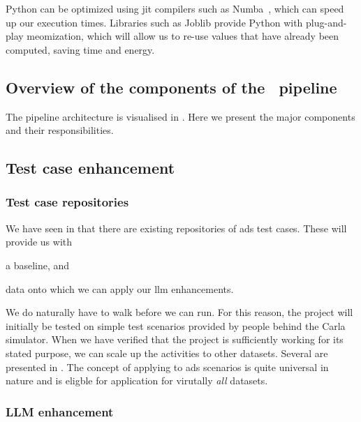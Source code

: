 Python can be optimized using \acrfull{jit} compilers such as Numba~\cite{numba}, which can speed up
our execution times. Libraries such as Joblib provide Python with plug-and-play
meomization, which will allow us to re-use values that have already been
computed, saving time and energy.


\subsection{Overview of the components of the \hefe~pipeline}

The pipeline architecture is visualised in . Here we
present the major components and their responsibilities.


\subsection*{Test case enhancement}

\subsubsection{Test case repositories}

We have seen in  that there are existing repositories of
\acrshort{ads} test cases. These will provide us with \begin{inparaenum}
    \item a baseline,
    and
    \item data onto which we can apply our \acrshort{llm} enhancements.
\end{inparaenum}

We do naturally have to walk before we can run. For this reason, the project will initially be
tested on simple test scenarios provided by people behind the Carla simulator. When we have verified
that the project is sufficiently working for its stated purpose, we can scale up the activities to
other datasets. Several are presented in . The concept of applying
 to \acrshort{ads} scenarios is quite universal in nature and is eligble for
application for virutally \emph{all} datasets.

\subsubsection{LLM enhancement}\label{sec:llmEnhancement}

